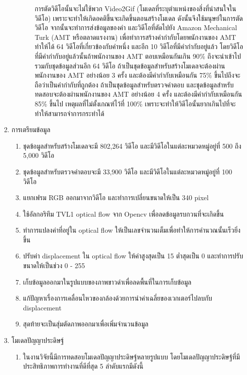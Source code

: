 \begin{enumerate}
\begin{enumerate}
\begin{enumerate}
		การตัดวิดีโอนั้นจะไม่ใช้พวก Video2Gif (โมเดลที่ระบุตำแหน่งของสิ่งที่น่าสนใจในวิดีโอ) เพราะจะทำให้เกิดอคติขึ้นจะเกิดขึ้นตอนสร้างโมเดล ดังนั้นจึงใช้มนุษย์ในการตัดวิดีโอ จากนั้นจะทำการส่งข้อมูลของคำ
		และวิดีโอที่ตัดไปยัง Amazon Mechanical Turk (AMT หรือตลาดแรงงาน) เพื่อทำการสร้างคำกำกับโดยพนักงานของ AMT ทำให้ได้ 64 วิดีโอที่เกี่ยวข้องกับคำหนึ่ง 
		และอีก 10 วิดีโอที่มีคำกำกับอยู่แล้ว โดยวิดีโอที่มีคำกำกับอยู่แล้วนั้นถ้าพนักงานของ AMT ตอบเหมือนกันเกิน 90\% ถึงจะนำเข้าไปรวมกับชุดข้อมูลส่วนอีก 64 วิดีโอ
		ถ้าเป็นชุดข้อมูลสำหรับสร้างโมเดลจะต้องผ่านพนักงานของ AMT อย่างน้อย 3 ครั้ง และต้องมีคำกำกับเหมือนกัน 75\% ขึ้นไปถึงจะถือว่าเป็นคำกำกับที่ถูกต้อง 
		ถ้าเป็นชุดข้อมูลสำหรับตรวจคำตอบ และชุดข้อมูลสำหรับทดสอบจะต้องผ่านพนักงานของ AMT อย่างน้อย 4 ครั้ง และต้องมีคำกำกับเหมือนกัน 85\% ขึ้นไป 
		เหตุผลที่ไม่ตั้งเกณฑ์ไว้ที่ 100\% เพราะจะทำให้วิดีโอนั้นยากเกินไปที่จะทำให้สามารถจำการกระทำได้	
	\end{enumerate}
\end{enumerate}
	\item การเตรียมข้อมูล
		\begin{enumerate}
			\item ชุดข้อมูลสำหรับสร้างโมเดลจะมี 802,264 วิดีโอ และมีวิดีโอในแต่ละหมวดหมู่อยู่ที่ 500 ถึง 5,000 วิดีโอ
			\item ชุดข้อมูลสำหรับตรวจคำตอบจะมี 33,900 วิดีโอ และมีวิดีโอในแต่ละหมวดหมู่อยู่ที่ 100 วิดีโอ
			\item แยกเฟรม RGB ออกมาจากวิดีโอ และทำการเปลี่ยนขนาดให้เป็น 340  pixel
			\item ใช้อัลกอริทึม TVL1 optical flow จาก Opencv เพื่อลดข้อมูลรบกวนที่จะเกิดขึ้น
			\item ทำการแปลงค่าที่อยู่ใน optical flow ให้เป็นเลขจำนวนเต็มเพื่อทำให้การคำนวณนั้นเร็วยิ่งขึ้น
			\item ปรับค่า displacement ใน optical flow ให้ค่าสูงสุดเป็น 15 ต่ำสุดเป็น 0 และทำการปรับขนาดให้เป็นช่วง 0 - 255
			\item เก็บข้อมูลออกมาในรูปแบบของภาพขาวดำเพื่อลดพื้นที่ในการเก็บข้อมูล
			\item แก้ปัญหาเรื่องการเคลื่อนไหวของกล้องด้วยการนำค่าเฉลี่ยของเวกเตอร์ไปลบกับ displacement
			\item สุดท้ายจะเป็นสุ่มตัดภาพออกมาเพื่อเพิ่มจำนวนข้อมูล
		\end{enumerate}
	\item {โมเดลปัญญาประดิษฐ์}
	\begin{enumerate}
		\item ในงานวิจัยนี้มีการทดสอบโมเดลปัญญาประดิษฐ์หลายรูปแบบ โดยโมเดลปัญญาประดิษฐ์ที่มีประสิทธิภาพการทำงานที่ดีที่สุด 5 ลำดับแรกมีดังนี้

\end{enumerate}
\end{enumerate}
